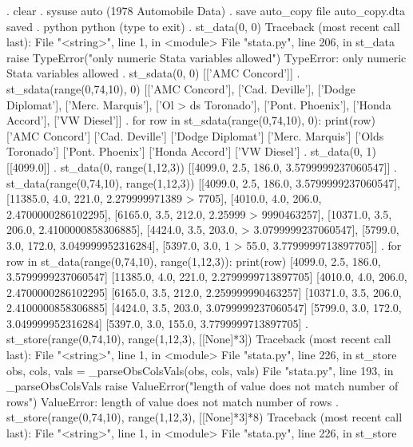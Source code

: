 \documentclass{article}
\begin{document}
\begin{stlog}
. clear
{\smallskip}
. sysuse auto
(1978 Automobile Data)
{\smallskip}
. save auto_copy
file auto_copy.dta saved
{\smallskip}
. python
 python (type {} to exit) 
{\bftt{>>>}}. st_data(0, 0)
{\color{red}Traceback (most recent call last):
  File "<string>", line 1, in <module>
  File "stata.py", line 206, in st_data
    raise TypeError("only numeric Stata variables allowed")
TypeError: only numeric Stata variables allowed}
{\smallskip}
{\bftt{>>>}}. st_sdata(0, 0)
[['AMC Concord']]
{\smallskip}
{\bftt{>>>}}. st_sdata(range(0,74,10), 0)
[['AMC Concord'], ['Cad. Deville'], ['Dodge Diplomat'], ['Merc. Marquis'], ['Ol
> ds Toronado'], ['Pont. Phoenix'], ['Honda Accord'], ['VW Diesel']]
{\smallskip}
{\bftt{>>>}}. for row in st_sdata(range(0,74,10), 0): print(row)
['AMC Concord']
['Cad. Deville']
['Dodge Diplomat']
['Merc. Marquis']
['Olds Toronado']
['Pont. Phoenix']
['Honda Accord']
['VW Diesel']
{\smallskip}
{\bftt{>>>}}. st_data(0, 1)
[[4099.0]]
{\smallskip}
{\bftt{>>>}}. st_data(0, range(1,12,3))
[[4099.0, 2.5, 186.0, 3.5799999237060547]]
{\smallskip}
{\bftt{>>>}}. st_data(range(0,74,10), range(1,12,3))
[[4099.0, 2.5, 186.0, 3.5799999237060547], [11385.0, 4.0, 221.0, 2.279999971389
> 7705], [4010.0, 4.0, 206.0, 2.4700000286102295], [6165.0, 3.5, 212.0, 2.25999
> 9990463257], [10371.0, 3.5, 206.0, 2.4100000858306885], [4424.0, 3.5, 203.0, 
> 3.0799999237060547], [5799.0, 3.0, 172.0, 3.049999952316284], [5397.0, 3.0, 1
> 55.0, 3.7799999713897705]]
{\smallskip}
{\bftt{>>>}}. for row in st_data(range(0,74,10), range(1,12,3)): print(row)
[4099.0, 2.5, 186.0, 3.5799999237060547]
[11385.0, 4.0, 221.0, 2.2799999713897705]
[4010.0, 4.0, 206.0, 2.4700000286102295]
[6165.0, 3.5, 212.0, 2.259999990463257]
[10371.0, 3.5, 206.0, 2.4100000858306885]
[4424.0, 3.5, 203.0, 3.0799999237060547]
[5799.0, 3.0, 172.0, 3.049999952316284]
[5397.0, 3.0, 155.0, 3.7799999713897705]
{\smallskip}
{\bftt{>>>}}. st_store(range(0,74,10), range(1,12,3), [[None]*3])
{\color{red}Traceback (most recent call last):
  File "<string>", line 1, in <module>
  File "stata.py", line 226, in st_store
    obs, cols, vals = _parseObsColsVals(obs, cols, vals)
  File "stata.py", line 193, in _parseObsColsVals
    raise ValueError("length of value does not match number of rows")
ValueError: length of value does not match number of rows}
{\smallskip}
{\bftt{>>>}}. st_store(range(0,74,10), range(1,12,3), [[None]*3]*8)
{\color{red}Traceback (most recent call last):
  File "<string>", line 1, in <module>
  File "stata.py", line 226, in st_store
}
\end{stlog}
\end{document}
